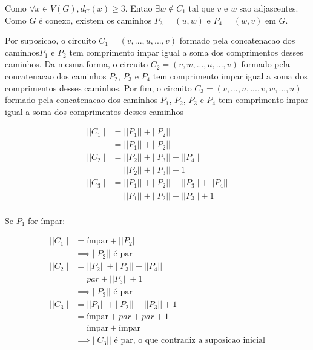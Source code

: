 \documentclass{article}
\begin{document}
Como $\forall x \in V(G), d_G(x) \geq 3 $. Entao $\exists w \notin C_1$ tal que $v$ e $w$ sao adjascentes. Como $G$ é conexo, existem os caminhos $P_3 = (u,w)$ e $P_4 = (w,v)$ em $G$.




Por suposicao, o circuito $C_1 = (v,...,u,...,v)$ formado pela concatenacao dos caminhos$P_1$ e $P_2$ tem comprimento impar igual a soma dos comprimentos desses caminhos. Da mesma forma, o circuito $C_2 = (v,w,...,u,...,v)$ formado pela concatenacao dos caminhos $P_2$, $P_3$ e $P_4$ tem comprimento impar igual a soma dos comprimentos desses caminhos. Por fim, o circuito $C_3 = (v,...,u,...,v,w,...,u)$ formado pela concatenacao dos caminhos $P_1$, $P_2$, $P_3$ e $P_4$ tem comprimento impar igual a soma dos comprimentos desses caminhos

\begin{align}
    ||C_1|| &= ||P_1|| + ||P_2|| \\
                &= ||P_1|| + ||P_2|| \\
    ||C_2|| &= ||P_2|| + ||P_3|| + ||P_4|| \\
                &= ||P_2|| + ||P_3||  + 1 \\
  	||C_3|| &= ||P_1|| + ||P_2|| + ||P_3||  + ||P_4|| \\  
  	           &= ||P_1|| + ||P_2|| + ||P_3||  + 1  \\  
\end{align}

Se $P_1$ for ímpar:

\begin{align}
	||C_1|| &= \text{ímpar} + ||P_2|| \\
	&\implies ||P_2|| \text{  é par} \\
	||C_2|| &= ||P_2|| + ||P_3|| + ||P_4|| \\
	&= par + ||P_3||  + 1 \\
	&\implies ||P_3|| \text{   é par} \\
	||C_3|| &= ||P_1|| + ||P_2|| + ||P_3||  +1 \\  
               &= \text{ímpar} + par + par  +1 \\  
               &= \text{ímpar} + \text{ímpar}  \\  
                &\implies 	||C_3|| \text{   é par, o que contradiz a suposicao inicial} \\  
\end{align}
\end{document}
